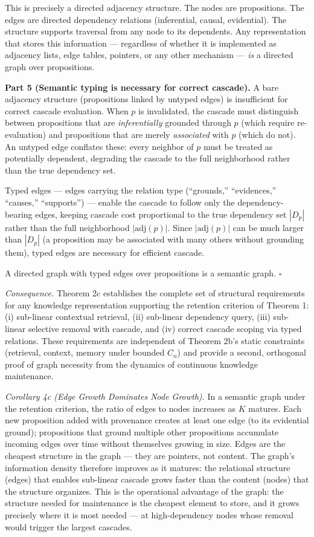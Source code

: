 \documentclass[
]{article}
\begin{document}
This is precisely a directed adjacency structure. The nodes are
propositions. The edges are directed dependency relations (inferential,
causal, evidential). The structure supports traversal from any node to
its dependents. Any representation that stores this information ---
regardless of whether it is implemented as adjacency lists, edge tables,
pointers, or any other mechanism --- \emph{is} a directed graph over
propositions.

\textbf{Part 5 (Semantic typing is necessary for correct cascade).} A
bare adjacency structure (propositions linked by untyped edges) is
insufficient for correct cascade evaluation. When \(p\) is invalidated,
the cascade must distinguish between propositions that are
\emph{inferentially} grounded through \(p\) (which require
re-evaluation) and propositions that are merely \emph{associated} with
\(p\) (which do not). An untyped edge conflates these: every neighbor of
\(p\) must be treated as potentially dependent, degrading the cascade to
the full neighborhood rather than the true dependency set.

Typed edges --- edges carrying the relation type (``grounds,''
``evidences,'' ``causes,'' ``supports'') --- enable the cascade to
follow only the dependency-bearing edges, keeping cascade cost
proportional to the true dependency set \(|D_p|\) rather than the full
neighborhood \(|\text{adj}(p)|\). Since \(|\text{adj}(p)|\) can be much
larger than \(|D_p|\) (a proposition may be associated with many others
without grounding them), typed edges are necessary for efficient cascade.

A directed graph with typed edges over propositions is a semantic graph.
\(\square\)

\emph{Consequence.} Theorem 2c establishes the complete set of
structural requirements for any knowledge representation supporting the
retention criterion of Theorem 1: (i) sub-linear contextual retrieval,
(ii) sub-linear dependency query, (iii) sub-linear selective removal
with cascade, and (iv) correct cascade scoping via typed relations.
These requirements are independent of Theorem 2b's static constraints
(retrieval, context, memory under bounded \(C_n\)) and provide a second,
orthogonal proof of graph necessity from the dynamics of continuous
knowledge maintenance.

\emph{Corollary 4c (Edge Growth Dominates Node Growth).} In a semantic
graph under the retention criterion, the ratio of edges to nodes
increases as \(K\) matures. Each new proposition added with provenance
creates at least one edge (to its evidential ground); propositions that
ground multiple other propositions accumulate incoming edges over time
without themselves growing in size. Edges are the cheapest structure in
the graph --- they are pointers, not content. The graph's information
density therefore improves as it matures: the relational structure
(edges) that enables sub-linear cascade grows faster than the content
(nodes) that the structure organizes. This is the operational advantage
of the graph: the structure needed for maintenance is the cheapest
element to store, and it grows precisely where it is most needed ---
at high-dependency nodes whose removal would trigger the largest
cascades.
\end{document}
